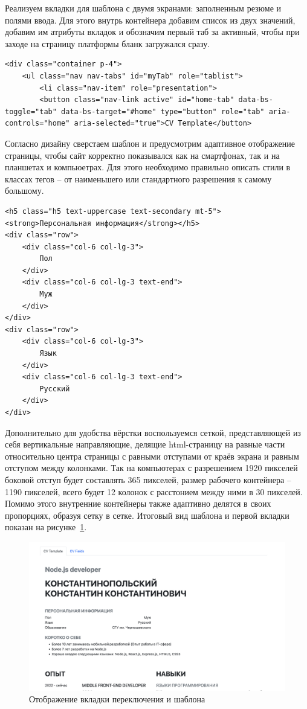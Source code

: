 \documentclass[master, och, diploma]{SCWorks}
\begin{document}
Реализуем вкладки для шаблона с двумя экранами: заполненным резюме и полями ввода. Для этого внутрь контейнера добавим список из двух значений, добавим им атрибуты вкладок и обозначим первый таб за активный, чтобы при заходе на страницу платформы бланк загружался сразу.
\begin{verbatim}
<div class="container p-4">
    <ul class="nav nav-tabs" id="myTab" role="tablist">
        <li class="nav-item" role="presentation">
        <button class="nav-link active" id="home-tab" data-bs-toggle="tab" data-bs-target="#home" type="button" role="tab" aria-controls="home" aria-selected="true">CV Template</button>
\end{verbatim}

Согласно дизайну сверстаем шаблон и предусмотрим адаптивное отображение страницы, чтобы сайт корректно показывался как на смартфонах, так и на планшетах и компьюетрах. Для этого необходимо правильно описать стили в классах тегов – от наименьшего или стандартного разрешения к самому большому. 
\begin{verbatim}
<h5 class="h5 text-uppercase text-secondary mt-5">
<strong>Персональная информация</strong></h5>
<div class="row">
    <div class="col-6 col-lg-3">
        Пол
    </div>
    <div class="col-6 col-lg-3 text-end">
        Муж
    </div>
</div>
<div class="row">
    <div class="col-6 col-lg-3">
        Язык
    </div>
    <div class="col-6 col-lg-3 text-end">
        Русский
    </div>
</div>
\end{verbatim}

Дополнительно для удобства вёрстки воспользуемся сеткой, представляющей из себя вертикальные направляющие, делящие html-страницу на равные части относительно центра страницы с равными отступами от краёв экрана и равным отступом между колонками. Так на компьютерах с разрешением 1920 пикселей боковой отступ будет составлять 365 пикселей, размер рабочего контейнера – 1190 пикселей, всего будет 12 колонок с расстонием между ними в 30 пикселей. Помимо этого внутренние контейнеры также адаптивно делятся в своих пропорциях, образуя сетку в сетке. Итоговый вид шаблона и первой вкладки показан на рисунке~\ref{fig:23}.
\begin{figure}[!ht]
    \centering
    \includegraphics[width=12cm]{images/image23.png}
    \caption{\label{fig:23}%
        Отображение вкладки переключения и шаблона}
\end{figure}
\end{document}
